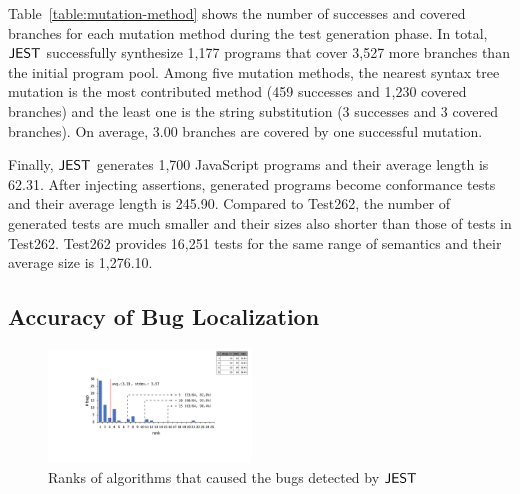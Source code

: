 Table~\ref{table:mutation-method} shows the number of successes and covered
branches for each mutation method during the test generation phase.  In total,
$\tool$ successfully synthesize 1,177 programs that cover 3,527
more branches than the initial program pool.  Among five mutation methods, the
nearest syntax tree mutation is the most contributed method (459
successes and 1,230 covered branches) and the least one is the string
substitution (3 successes and 3 covered branches).  On average,
3.00 branches are covered by one successful mutation.

Finally, $\tool$ generates 1,700 JavaScript programs and their average length is
62.31.  After injecting assertions, generated programs become conformance tests
and their average length is 245.90.  Compared to Test262, the number of
generated tests are much smaller and their sizes also shorter than those of
tests in Test262.  Test262 provides 16,251 tests for the same range of semantics
and their average size is 1,276.10.


\subsection{Accuracy of Bug Localization}

\begin{figure}[t]
  \centering
  \includegraphics[width=0.48\textwidth]{img/localize.pdf}
  \caption{Ranks of algorithms that caused the bugs detected by $\tool$}
  \label{fig:localize}
  \vspace*{-1em}
\end{figure}

